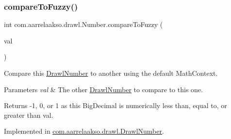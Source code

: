 \mbox{\label{interfacecom_1_1aarrelaakso_1_1drawl_1_1_number_abe6993852fed7bc6f13dbda74b78dde3}} 
\subsubsection{\texorpdfstring{compare\+To\+Fuzzy()}{compareToFuzzy()}\hspace{0.1cm}{\footnotesize\ttfamily [1/2]}}
{\footnotesize\ttfamily int com.\+aarrelaakso.\+drawl.\+Number.\+compare\+To\+Fuzzy (\begin{DoxyParamCaption}\item[{@Not\+Null final \hyperlink{interfacecom_1_1aarrelaakso_1_1drawl_1_1_number}{Number}}]{val }\end{DoxyParamCaption})}



Compare this \hyperlink{classcom_1_1aarrelaakso_1_1drawl_1_1_drawl_number}{Drawl\+Number} to another using the default Math\+Context. 


\begin{DoxyParams}{Parameters}
{\em val} & The other \hyperlink{classcom_1_1aarrelaakso_1_1drawl_1_1_drawl_number}{Drawl\+Number} to compare to this one. \\
\hline
\end{DoxyParams}
\begin{DoxyReturn}{Returns}
-\/1, 0, or 1 as this Big\+Decimal is numerically less than, equal to, or greater than val. 
\end{DoxyReturn}


Implemented in \hyperlink{classcom_1_1aarrelaakso_1_1drawl_1_1_drawl_number_ab2624aa98592bb5dd20990c7f5921024}{com.\+aarrelaakso.\+drawl.\+Drawl\+Number}.

\mbox{\label{interfacecom_1_1aarrelaakso_1_1drawl_1_1_number_afb73cae0a12c1d25e450be6270eecfb1}} 

